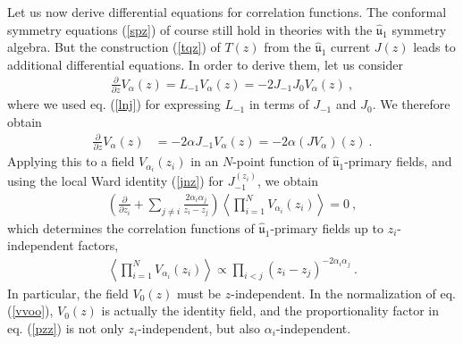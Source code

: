 \documentclass[12pt,a4paper,notitlepage]{report}
\newcommand \la {\left\langle}
\newcommand \ra {\right\rangle}
\newcommand \p {\partial}
\newcommand \pp[1] {{\frac{\p}{\p #1}}}
\numberwithin{equation}{section}
\theoremstyle{break}
\begin{document}
Let us now derive differential equations for correlation functions. The conformal symmetry equations (\ref{spz}) of course still hold in theories with the $\hat{\mathfrak{u}}_1$ symmetry algebra. But the construction (\ref{tqz}) of $T(z)$ from the $\hat{\mathfrak{u}}_1$ current $J(z)$ leads to additional differential equations. In order to derive them, let us consider 
\begin{align}
 \pp{z} V_{\alpha}(z) = L_{-1}V_\alpha(z) = -2J_{-1}J_0 V_\alpha(z)\ ,
\end{align}
where we used eq. (\ref{lnj}) for expressing $L_{-1}$ in terms of $J_{-1}$ and $J_0$. We therefore obtain
\begin{align}
\pp{z} V_{\alpha}(z)&= -2\alpha J_{-1}V_\alpha(z) = -2\alpha(JV_\alpha)(z)\ .
\label{pvaj}
\end{align}
Applying this to a field $V_{\alpha_i}(z_i)$ in an 
$N$-point function of $\hat{\mathfrak{u}}_1$-primary fields, and using 
the local Ward identity (\ref{jnz}) for $J_{-1}^{(z_i)}$, we obtain 
\begin{align}
\left( \pp{z_i} +\sum_{j\neq i} \frac{2\alpha_i\alpha_j}{z_i-z_j} \right) \la \prod_{i=1}^N V_{\alpha_i}(z_i) \ra = 0 \ ,
\label{kzl}
\end{align}
which determines the correlation functions of $\hat{\mathfrak{u}}_1$-primary fields up to $z_i$-independent factors, 
\begin{align}
 \boxed{\la \prod_{i=1}^N V_{\alpha_i}(z_i)\ra  \propto \prod_{i<j} (z_i-z_j)^{-2\alpha_i\alpha_j}}\ .
\label{pzz}
\end{align}
In particular, the field $V_0(z)$ must be $z$-independent. In the normalization of eq. (\ref{vvoo}), $V_0(z)$ is actually the identity field, and the proportionality factor in eq. (\ref{pzz}) is not only $z_i$-independent, but also $\alpha_i$-independent.
\end{document}
